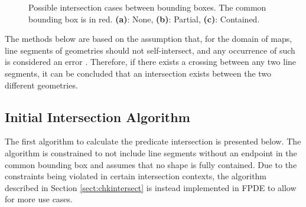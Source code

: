  \begin{figure}[htbp]
    \centering
    \qquad
    \qquad
    \caption{Possible intersection cases between bounding boxes. The common bounding box is in red. \textbf{(a)}: None, \textbf{(b)}: Partial, \textbf{(c)}: Contained.}
    \label{fig:bbi}
\end{figure}

The methods below are based on the assumption that, for the domain of maps, line segments of geometries should not self-intersect, and any occurrence of such is considered an error \cite{self_intersection}. Therefore, if there exists a crossing between any two line segments, it can be concluded that an intersection exists between the two different geometries.


\label{initialAlgo}
\subsection{Initial Intersection Algorithm}

The first algorithm to calculate the predicate intersection is presented below. The algorithm is constrained to not include line segments without an endpoint in the common bounding box and assumes that no shape is fully contained. Due to the constraints being violated in certain intersection contexts, the algorithm described in Section \ref{sect:chkintersect} is instead implemented in FPDE  to allow for more use cases.

